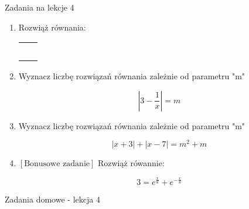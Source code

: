 \documentclass[12pt,a4paper]{article}
\begin{document}
	
	\begin{center}
		\LARGE Zadania na lekcje 4
	\end{center}
	\vspace{1.5cm}
	
	\begin{enumerate}[1.]
		\item Rozwiąż równania:
		
		\begin{enumerate}[a)] \begin{tabular}{p{7cm} p{7cm}} 
				\item $|3x-4|=7$ & \vspace{0.4cm} 	\item$2|x+6|=-4$ \\
				\item $|2x-3|-|3x+3|=x-6$ & \item $2-|x+4|=x^2+3x-2$ \\
				\item $x^2+4x+|x+2|=16$ & \item $x^2+2x+2=2|x+1|$ \\
				\item $(x+1)(|x|-1)=-0,5$ & \item $|x^2+2x+3|=|2x|$ \\
				\item $|x^2-4x+3|=1 $ & \item $x^2-7|x|+10\leq 10 $ \\
		\end{tabular} \end{enumerate}
		
		\item Wyznacz liczbę rozwiązań równania zależnie od parametru "m"
		
		$$|3-\frac{1}{x}|=m$$
		
		\item Wyznacz liczbę rozwiązań równania zależnie od parametru "m"
		
		$$|x+3|+|x-7|=m^2+m $$
		
		\item $[\text{Bonusowe zadanie}]$ Rozwiąż rówannie:
		
		\Large$$3=e^\frac{x}{8}+e^{-\frac{x}{8}}$$\normalsize
		
	\end{enumerate}
	
	\newpage
	
	\begin{center}
		\LARGE Zadania domowe - lekcja 4
	\end{center}
	\vspace{1.5cm}
	
\end{document}
